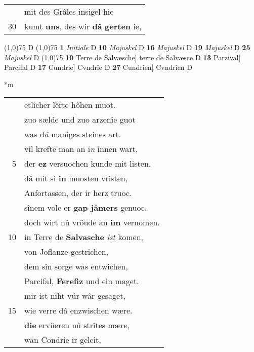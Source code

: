 \documentclass[8pt,a4paper,notitlepage]{article}
\begin{document}
\begin{table}[ht]
\begin{minipage}[t]{0.5\linewidth}
\begin{tabular}{rl}
 & mit des Grâles insigel hie\\ 
30 & kumt \textbf{uns}, des wir \textbf{dâ} \textbf{gerten} ie,\\ 
\end{tabular}
\scriptsize
\line(1,0){75} \newline
D \newline
\line(1,0){75} \newline
\textbf{1} \textit{Initiale} D  \textbf{10} \textit{Majuskel} D  \textbf{16} \textit{Majuskel} D  \textbf{19} \textit{Majuskel} D  \textbf{25} \textit{Majuskel} D  \newline
\line(1,0){75} \newline
\textbf{10} Terre de Salvæsche] terre de Salvæsce D \textbf{13} Parzival] Parcifal D \textbf{17} Cundrie] Cvndrîe D \textbf{27} Cundrien] Cvndrîen D \newline
\end{minipage}
\hspace{0.5cm}
\begin{minipage}[t]{0.5\linewidth}
\small
\begin{center}*m
\end{center}
\begin{tabular}{rl}
 & etlîcher lêrte hôhen muot.\\ 
 & zuo sælde und zuo arzenîe guot\\ 
 & was d\textit{â} maniges steines art.\\ 
 & vil krefte man an i\textit{n} innen wart,\\ 
5 & der \textbf{ez} versuochen kunde mit listen.\\ 
 & dâ mit si \textbf{in} muosten vristen,\\ 
 & Anfortassen, der ir herz truoc.\\ 
 & sînem volc er \textbf{gap jâmers} genuoc.\\ 
 & doch wirt nû vröude an \textbf{im} vernomen.\\ 
10 & in Terre de \textbf{Salvasche} \textit{ist} komen,\\ 
 & von Joflanze gestrichen,\\ 
 & dem sîn sorge was entwichen,\\ 
 & Parcifal, \textbf{Ferefiz} und ein maget.\\ 
 & mir ist niht vür wâr gesaget,\\ 
15 & wie verre dâ enzwischen wære.\\ 
 & \textbf{die} ervüeren nû strîtes mære,\\ 
 & wan Condrie ir geleit,\\ 

\end{tabular}
\end{minipage}
\end{table}
\end{document}
